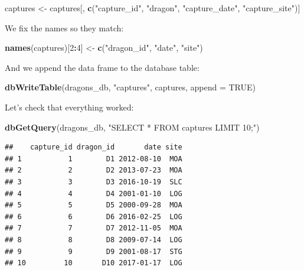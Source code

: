 \documentclass[
]{book}
\newenvironment{Shaded}{\begin{snugshade}}{\end{snugshade}}
\newcommand{\AttributeTok}[1]{\textcolor[rgb]{0.13,0.29,0.53}{#1}}
\newcommand{\ConstantTok}[1]{\textcolor[rgb]{0.56,0.35,0.01}{#1}}
\newcommand{\DecValTok}[1]{\textcolor[rgb]{0.00,0.00,0.81}{#1}}
\newcommand{\FunctionTok}[1]{\textcolor[rgb]{0.13,0.29,0.53}{\textbf{#1}}}
\newcommand{\NormalTok}[1]{#1}
\newcommand{\OtherTok}[1]{\textcolor[rgb]{0.56,0.35,0.01}{#1}}
\newcommand{\SpecialCharTok}[1]{\textcolor[rgb]{0.81,0.36,0.00}{\textbf{#1}}}
\newcommand{\StringTok}[1]{\textcolor[rgb]{0.31,0.60,0.02}{#1}}
\begin{document}
\begin{Shaded}
\begin{Highlighting}[]
\NormalTok{captures }\OtherTok{\textless{}{-}}\NormalTok{ captures[, }\FunctionTok{c}\NormalTok{(}\StringTok{"capture\_id"}\NormalTok{, }\StringTok{"dragon"}\NormalTok{, }\StringTok{"capture\_date"}\NormalTok{, }\StringTok{"capture\_site"}\NormalTok{)]}
\end{Highlighting}
\end{Shaded}

We fix the names so they match:

\begin{Shaded}
\begin{Highlighting}[]
\FunctionTok{names}\NormalTok{(captures)[}\DecValTok{2}\SpecialCharTok{:}\DecValTok{4}\NormalTok{] }\OtherTok{\textless{}{-}} \FunctionTok{c}\NormalTok{(}\StringTok{"dragon\_id"}\NormalTok{, }\StringTok{"date"}\NormalTok{, }\StringTok{"site"}\NormalTok{)}
\end{Highlighting}
\end{Shaded}

And we append the data frame to the database table:

\begin{Shaded}
\begin{Highlighting}[]
\FunctionTok{dbWriteTable}\NormalTok{(dragons\_db, }\StringTok{"captures"}\NormalTok{, captures, }\AttributeTok{append =} \ConstantTok{TRUE}\NormalTok{)}
\end{Highlighting}
\end{Shaded}

Let's check that everything worked:

\begin{Shaded}
\begin{Highlighting}[]
\FunctionTok{dbGetQuery}\NormalTok{(dragons\_db, }\StringTok{"SELECT * FROM captures LIMIT 10;"}\NormalTok{)}
\end{Highlighting}
\end{Shaded}

\begin{verbatim}
##    capture_id dragon_id       date site
## 1           1        D1 2012-08-10  MOA
## 2           2        D2 2013-07-23  MOA
## 3           3        D3 2016-10-19  SLC
## 4           4        D4 2001-01-10  LOG
## 5           5        D5 2000-09-28  MOA
## 6           6        D6 2016-02-25  LOG
## 7           7        D7 2012-11-05  MOA
## 8           8        D8 2009-07-14  LOG
## 9           9        D9 2001-08-17  STG
## 10         10       D10 2017-01-17  LOG
\end{verbatim}
\end{document}
